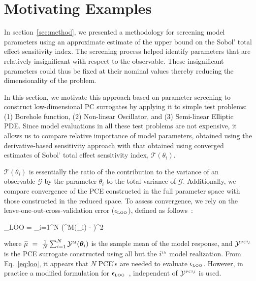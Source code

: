 \section{Motivating Examples}
\label{sec:examples}

In section~\ref{sec:method}, we presented a methodology for screening model
parameters using an approximate estimate of the upper bound on the Sobol'
total effect sensitivity index. The screening process helped identify parameters
that are relatively insignificant with respect to the observable. These insignificant
parameters could thus be fixed at their nominal values thereby reducing the
dimensionality of the problem. 

In this section, we motivate this approach based
on parameter screening to construct low-dimensional PC surrogates by 
applying it to simple test problems: (1) Borehole function, (2) Non-linear Oscillator, and
(3) Semi-linear Elliptic PDE. Since model evaluations in all these test
problems are not expensive, it allows us to compare relative importance of
model parameters,
obtained using the derivative-based sensitivity approach with that obtained
using converged estimates of Sobol' total effect sensitivity index, $\mathcal{T}(\theta_i)$.


\noindent $\mathcal{T}(\theta_i)$ is essentially the ratio of the contribution to the variance of an
observable $\mathcal{G}$ by the parameter $\theta_i$ to the total variance of $\mathcal{G}$.
Additionally, we compare convergence of the PCE constructed in
the full parameter space with those constructed in the reduced space. To assess convergence, 
we rely on the 
leave-one-out-cross-validation error ($\epsilon_{\mbox{\tiny LOO}}$), defined
as follows~\cite{Blatman:2010}:

\be
\epsilon_{\mbox{\tiny LOO}} = 
{\sum_{i=1}^N
\left(^{\mbox{\tiny M}}(\bm{\theta}_i) - \widetilde{\mu}\right)^2}
\label{eq:loo}
\ee

\noindent where $\widetilde{\mu}~=~\frac{1}{N}\sum_{i=1}^N \mathcal{Y}^{\mbox{\tiny M}}(\bm{\theta}_i)$
is the sample mean of the model response, and $ \mathcal{Y}^{\mbox{\tiny {PC}\textbackslash i}}$
is the PCE surrogate constructed using all but the $i^{\mbox{\tiny{th}}}$ model realization. 
From Eq.~\ref{eq:loo}, it appears that $N$ PCE's are needed to evaluate $\epsilon_{\mbox{\tiny LOO}}$.
However, in practice a modified formulation for $\epsilon_{\mbox{\tiny LOO}}$~\cite{Blatman:2009},
independent of $\mathcal{Y}^{\mbox{\tiny {PC}\textbackslash i}}$ is used.


